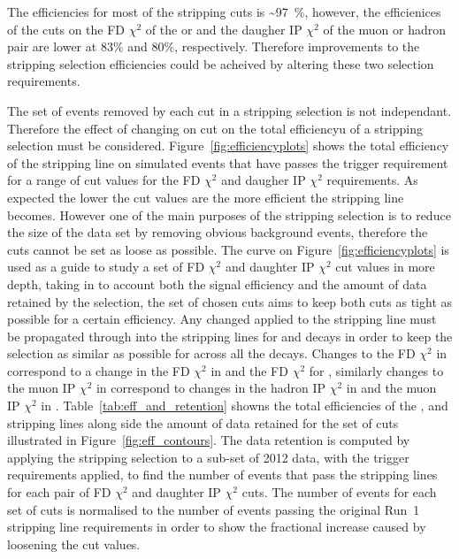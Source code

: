 The efficiencies for most of the stripping cuts is \sim 97~$\%$, however, the efficienices of the cuts on the FD $\chi^{2}$ of the \bsd or \jpsi and the daugher IP $\chi^{2}$ of the muon or hadron pair are lower at $83\%$ and $80\%$, respectively. Therefore improvements to the stripping selection efficiencies could be acheived by altering these two selection requirements. 


The set of events removed by each cut in a stripping selection is not independant. Therefore the effect of changing on cut on the total efficiencyu of a stripping selection must be considered. Figure~\ref{fig:efficiencyplots} shows the total efficiency of the \bsmumu stripping line on simulated \bsmumu events that have passes the trigger requirement for a range of cut values for the FD $\chi^{2}$ and daugher IP $\chi^{2}$ requirements. As expected the lower the cut values are the more efficient the stripping line becomes. However one of the main purposes of the stripping selection is to reduce the size of the data set by removing obvious background events, therefore the cuts cannot be set as loose as possible. The curve on Figure~\ref{fig:efficiencyplots} is used as a guide to study a set of FD $\chi^{2}$ and daughter IP $\chi^{2}$ cut values in more depth, taking in to account both the signal efficiency and the amount of data retained by the selection, the set of chosen cuts aims to keep both cuts as tight as possible for a certain efficiency. Any changed applied to the \bmumu stripping line must be propagated through into the stripping lines for \bhh and \bujpsik decays in order to keep the selection as similar as possible for across all the decays. Changes to the \bsd FD $\chi^{2}$ in \bsmumu correspond to a change in the \bsd FD $\chi^{2}$ in \bhh and the \jpsi FD $\chi^{2}$ for \bujpsik, similarly changes to the muon IP $\chi^{2}$ in \bsmumu correspond to changes in the hadron IP $\chi^{2}$ in \bhh and the muon IP $\chi^{2}$ in \bujpsik. Table~\ref{tab:eff_and_retention} showns the total efficiencies of the \bmumu, \bhh and \bujpsik stripping lines along side the amount of data retained for the set of cuts illustrated in Figure~\ref{fig:eff_contours}. The data retention is computed by applying the stripping selection to a sub-set of 2012 data, with the trigger requirements applied, to find the number of events that pass the stripping lines for each pair of FD $\chi^{2}$ and daughter IP $\chi^{2}$ cuts. The number of events for each set of cuts is normalised to the number of events passing the original Run~1 stripping line requirements in order to show the fractional increase caused by loosening the cut values. 


